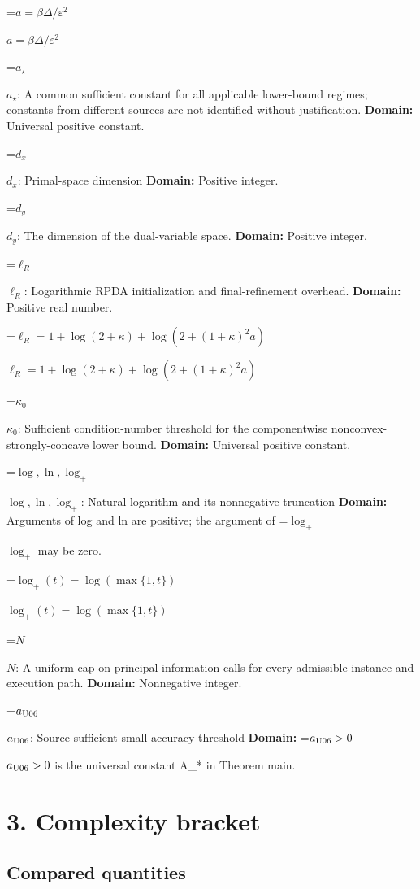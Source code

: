 \documentclass[10pt,a4paper]{article}
\newcommand{\AtlasMath}[1]{\par\begingroup\centering\setbox0=\hbox{$\displaystyle #1$}\ifdim\wd0>1.4\linewidth\typeout{ATLAS WIDE FORMULA: \the\wd0}\fi\ifdim\wd0>\linewidth\resizebox{\linewidth}{!}{\box0}\else\box0\fi\par\endgroup}
\newcommand{\AtlasInlineMath}[1]{\begingroup\setbox0=\hbox{$#1$}\ifdim\wd0>.4\linewidth\endgroup\AtlasMath{#1}\else\endgroup$#1$\fi}
\begin{document}
\AtlasInlineMath{a=\beta\Delta/\varepsilon^2}



\AtlasInlineMath{a_\star}: A common sufficient constant for all applicable lower-bound regimes; constants from different sources are not identified without justification. \textbf{Domain:} Universal positive constant.



\AtlasInlineMath{d_x}: Primal-space dimension \textbf{Domain:} Positive integer.



\AtlasInlineMath{d_y}: The dimension of the dual-variable space. \textbf{Domain:} Positive integer.



\AtlasInlineMath{\ell_R}: Logarithmic RPDA initialization and final-refinement overhead. \textbf{Domain:} Positive real number.



\AtlasInlineMath{\ell_R=1+\log(2+\kappa)+\log(2+(1+\kappa)^2a)}



\AtlasInlineMath{\kappa_0}: Sufficient condition-number threshold for the componentwise nonconvex-strongly-concave lower bound. \textbf{Domain:} Universal positive constant.



\AtlasInlineMath{\log,\ln,\log_+}: Natural logarithm and its nonnegative truncation \textbf{Domain:} Arguments of log and ln are positive; the argument of \AtlasInlineMath{\log_+} may be zero.



\AtlasInlineMath{\log_+(t)=\log(\max\{1,t\})}



\AtlasInlineMath{N}: A uniform cap on principal information calls for every admissible instance and execution path. \textbf{Domain:} Nonnegative integer.



\AtlasInlineMath{a_{\rm U06}}: Source sufficient small-accuracy threshold \textbf{Domain:} \AtlasInlineMath{a_{\rm U06}>0} is the universal constant A\_* in Theorem main.



\section{3. Complexity bracket}


\subsection{Compared quantities}
\end{document}
